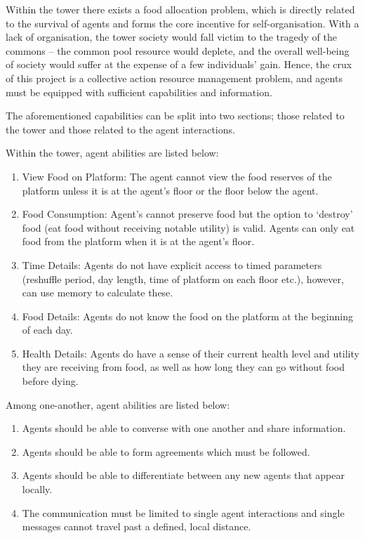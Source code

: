 Within the tower there exists a food allocation problem, which is directly related to the survival of agents and forms the core incentive for self-organisation. With a lack of organisation, the tower society would fall victim to the tragedy of the commons – the common pool resource would deplete, and the overall well-being of society would suffer at the expense of a few individuals’ gain. Hence, the crux of this project is a collective action resource management problem, and agents must be equipped with sufficient capabilities and information.
 
The aforementioned capabilities can be split into two sections; those related to the tower and those related to the agent interactions.
 
Within the tower, agent abilities are listed below:

\begin{enumerate}
    \item View Food on Platform: The agent cannot view the food reserves of the platform unless it is at the agent’s floor or the floor below the agent.
    \item Food Consumption: Agent’s cannot preserve food but the option to ‘destroy’ food (eat food without receiving notable utility) is valid. Agents can only eat food from the platform when it is at the agent’s floor.
    \item Time Details: Agents do not have explicit access to timed parameters (reshuffle period, day length, time of platform on each floor etc.), however, can use memory to calculate these.
    \item Food Details: Agents do not know the food on the platform at the beginning of each day.

    \item Health Details: Agents do have a sense of their current health level and utility they are receiving from food, as well as how long they can go without food before dying.
    
\end{enumerate}

Among one-another, agent abilities are listed below:

\begin{enumerate}
    \item Agents should be able to converse with one another and share information.
    \item Agents should be able to form agreements which must be followed.
    \item Agents should be able to differentiate between any new agents that appear locally.
    \item The communication must be limited to single agent interactions and single messages cannot travel past a defined, local distance. 
\end{enumerate}

